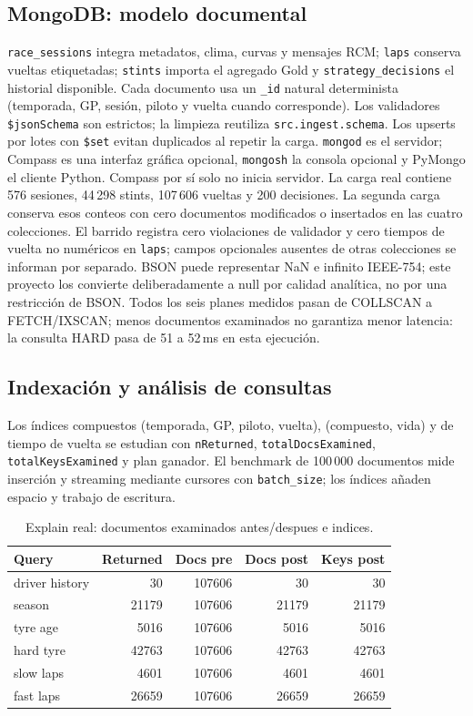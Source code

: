 \documentclass[conference]{IEEEtran}
\begin{document}
\subsection{MongoDB: modelo documental}
\texttt{race\_sessions} integra metadatos, clima, curvas y mensajes RCM;
\texttt{laps} conserva vueltas etiquetadas; \texttt{stints} importa el
agregado Gold y \texttt{strategy\_decisions} el historial disponible.
Cada documento usa un \texttt{\_id} natural determinista
(temporada, GP, sesión, piloto y vuelta cuando corresponde).
Los validadores \texttt{\$jsonSchema} son estrictos; la limpieza reutiliza
\texttt{src.ingest.schema}. Los upserts por lotes con \texttt{\$set}
evitan duplicados al repetir la carga. \texttt{mongod} es el servidor;
Compass es una interfaz gráfica opcional, \texttt{mongosh} la consola
opcional y PyMongo el cliente Python. Compass por sí solo no inicia servidor.
La carga real contiene 576 sesiones, 44\,298 stints, 107\,606 vueltas y
200 decisiones. La segunda carga conserva esos conteos con cero documentos
modificados o insertados en las cuatro colecciones. El barrido registra cero
violaciones de validador y cero tiempos de vuelta no numéricos en
\texttt{laps}; campos opcionales ausentes de otras colecciones se informan
por separado. BSON puede representar NaN e infinito IEEE-754; este proyecto
los convierte deliberadamente a null por calidad analítica, no por una
restricción de BSON. Todos los seis planes medidos pasan de COLLSCAN a
FETCH/IXSCAN; menos documentos examinados no garantiza menor latencia:
la consulta HARD pasa de 51 a 52\,ms en esta ejecución.


\subsection{Indexación y análisis de consultas}
Los índices compuestos (temporada, GP, piloto, vuelta), (compuesto, vida)
y de tiempo de vuelta se estudian con \texttt{nReturned},
\texttt{totalDocsExamined}, \texttt{totalKeysExamined} y plan ganador.
El benchmark de 100\,000 documentos mide inserción y streaming
mediante cursores con \texttt{batch\_size}; los índices añaden espacio y
trabajo de escritura.
\begin{table}[!htbp]\centering\scriptsize
\caption{Explain real: documentos examinados antes/despues e indices.}
\label{tab:phase9-explain}
\begin{tabular}{lrrrr}\toprule
Query & Returned & Docs pre & Docs post & Keys post \\
\midrule
driver history & 30 & 107606 & 30 & 30 \\
season & 21179 & 107606 & 21179 & 21179 \\
tyre age & 5016 & 107606 & 5016 & 5016 \\
hard tyre & 42763 & 107606 & 42763 & 42763 \\
slow laps & 4601 & 107606 & 4601 & 4601 \\
fast laps & 26659 & 107606 & 26659 & 26659 \\
\bottomrule\end{tabular}\end{table}
\end{document}
